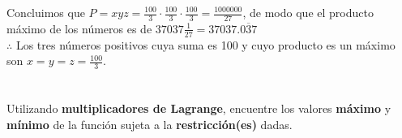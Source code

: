 \documentclass[12pt]{article}
\begin{document}
Concluimos que  $P=xyz=\frac{100}{3} \cdot \frac{100}{3} \cdot \frac{100}{3} = \frac{1000000}{27}$, de modo que el producto máximo de los números es de $37037\frac{1}{27} = 37037.\overline{037}$\\

$\therefore $ Los tres números positivos cuya suma es 100 y cuyo producto es un máximo son $x=y=z=\frac{100}{3}$.

\section{}

Utilizando \textbf{multiplicadores de Lagrange}, encuentre los valores \textbf{máximo} y \textbf{mínimo} de la función sujeta a la \textbf{restricción(es)} dadas.
\end{document}
